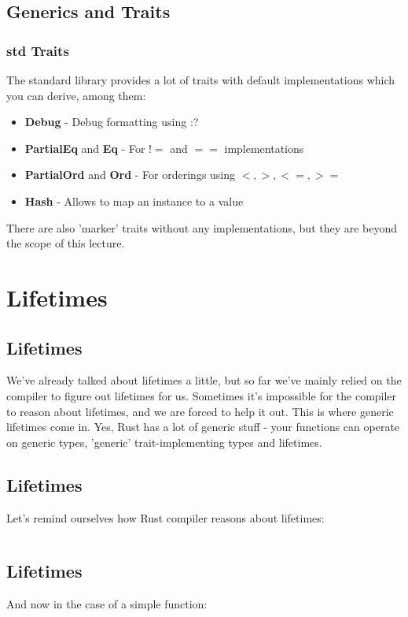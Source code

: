 \documentclass[usenames,twocolumn,dvipsnames,10pt,a4wide]{article}
\begin{document}
\subsection{Generics and Traits}
	\subsubsection{std Traits}
	The standard library provides a lot of traits with default
	implementations which you can derive, among them:
	\begin{itemize}[label=$\bullet$]
		\item \textbf{Debug} - Debug formatting using :?
		\item \textbf{PartialEq} and \textbf{Eq} - For $!=$ and $==$ implementations
		\item \textbf{PartialOrd} and \textbf{Ord} - For orderings using $<, >, <=, >=$
		\item \textbf{Hash} - Allows to map an instance to a value
	\end{itemize}
	There are also 'marker' traits without any implementations,
	but they are beyond the scope of this lecture.



\section{Lifetimes}
\subsection{Lifetimes}
	We've already talked about lifetimes a little, but so far
	we've mainly relied on the compiler to figure out lifetimes
	for us. Sometimes it's impossible for the compiler to
	reason about lifetimes, and we are forced to help it out.
	This is where generic lifetimes come in. Yes, Rust has a lot
	of generic stuff - your functions can operate on generic
	types, 'generic' trait-implementing types and lifetimes.


\subsection{Lifetimes}
	Let's remind ourselves how Rust compiler
	reasons about lifetimes:
	\inputminted[fontsize=\normalsize]{rust}{code/lifetimes1.rs}


\subsection{Lifetimes}
	And now in the case of a simple function:
	\inputminted[fontsize=\normalsize]{rust}{code/lifetimes2.rs}
\end{document}
